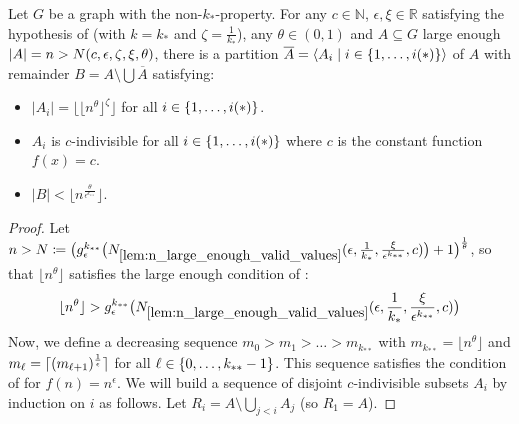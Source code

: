    \begin{theorem}[Theorem 4.23] \label{thm:equitative_partition_high_regularity_parts_grow_with_n}
        Let $G$ be a graph with the non-$k_*$-property.
        For any $c \in \mathbb{N}$, $\epsilon, \xi \in \mathbb{R}$ satisfying the hypothesis of 
        (with $k = k_*$ and $\zeta = \frac{1}{k_*}$), any $\theta \in (0,1)$ and $A \subseteq G$ large enough
        $| A | = n > N( c, \epsilon, \zeta, \xi, \theta )$,
        there is a partition $\overline{A} = \left< A_i \mid i \in \{ 1, \dots, i(*) \} \right>$ of $A$ with remainder $B = A \setminus \bigcup \overline{A}$
        satisfying:
        \begin{itemize}
            \item $|A_i| = \lfloor \lfloor n^\theta \rfloor ^\zeta \rfloor$ for all $i \in \{ 1, \dots, i(*) \}$.
            \item $A_i$ is $c$-indivisible for all $i \in \{ 1, \dots, i(*) \}$ where $c$ is the constant function $f(x) = c$.
            \item $|B| < \lfloor n^{\frac{\theta}{\epsilon^{k_{**}}}} \rfloor$.
        \end{itemize}
        \begin{proof}
            Let $n > N \coloneqq \bigl( g_\epsilon^{k_{**}}\bigl( N_{\ref{lem:n_large_enough_valid_values}}
                (  \epsilon, \frac{1}{k_*}, \frac{\xi}{\epsilon^{k_{**}}}, c ) \bigr) + 1  \bigr)^{\frac{1}{\theta}}$,
            so that $\lfloor n^\theta \rfloor$ satisfies the large enough condition of
            :
            \[
                \lfloor n^\theta \rfloor
                    > g_\epsilon^{k_{**}}\bigl( N_{\ref{lem:n_large_enough_valid_values}}
                        ( \epsilon, \frac{1}{k_*}, \frac{\xi}{\epsilon^{k_{**}}}, c ) \bigr)
            \]
            Now, we define a decreasing sequence $m_0 > m_1 > \dots > m_{k_{**}}$ with $m_{k_{**}} = \lfloor n^\theta \rfloor$
            and $m_{\ell} = \lceil ( m_{\ell+1} )^{\frac{1}{\epsilon}} \rceil$ for all $\ell \in \{ 0, \dots, k_{**}-1 \}$.
            This sequence satisfies the condition of  for $f(n) = n^\epsilon$.
            We will build a sequence of disjoint $c$-indivisible subsets $A_i$ by induction on $i$ as follows.
            Let $R_i = A \setminus \bigcup_{j<i} A_j$ (so $R_1 = A$).

\end{proof}
\end{theorem}
